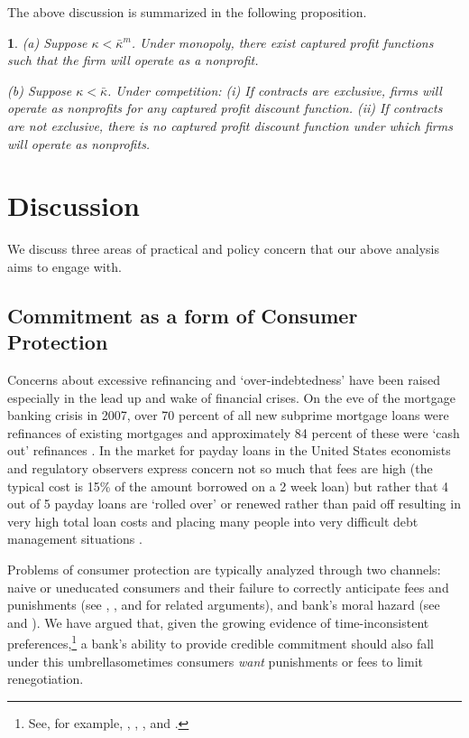 \documentclass[11pt,english]{article}
\theoremstyle{plain}
\newtheorem{prop}{\protect\propositionname}
\theoremstyle{definition}
\providecommand{\propositionname}{Proposition}
\begin{document}
The above discussion is summarized in the following proposition. 
\begin{prop}
(a) Suppose $\kappa<\bar{\kappa}^{m}$. Under monopoly, there exist
captured profit functions such that the firm will operate as a nonprofit.

(b) Suppose $\kappa<\bar{\kappa}$. Under competition: (i) If contracts
are exclusive, firms will operate as nonprofits for any captured profit
discount function. (ii) If contracts are not exclusive, there is no
captured profit discount function under which firms will operate as
nonprofits. 
\end{prop}

\section{Discussion}

We discuss three areas of practical and policy concern that our above
analysis aims to engage with.

\subsection{Commitment as a form of Consumer Protection}

Concerns about excessive refinancing and `over-indebtedness' have
been raised especially in the lead up and wake of financial crises.
On the eve of the mortgage banking crisis in 2007, over 70 percent
of all new subprime mortgage loans were refinances of existing mortgages
and approximately 84 percent of these were `cash out' refinances \citep{demyanyk2011}.
In the market for payday loans in the United States economists and
regulatory observers express concern not so much that fees are high
(the typical cost is 15\% of the amount borrowed on a 2 week loan)
but rather that 4 out of 5 payday loans are `rolled over' or renewed
rather than paid off resulting in very high total loan costs and placing
many people into very difficult debt management situations \citep{deyoung2015}.

Problems of consumer protection are typically analyzed through two
channels: naive or uneducated consumers and their failure to correctly
anticipate fees and punishments (see \citet{gabaix_shrouded_2006},
\citet{armstrong2012}, and \citet{akerlof2015} for related arguments),
and bank's moral hazard (see \citet{dewatripont1999} and \citet{oak2010}).
We have argued that, given the growing evidence of time-inconsistent
preferences,\footnote{See, for example, \citet{laibson2003}, \citet{ashraf_tying_2006},
\citet{gugerty2007}, and \citet{tanaka2010}.} a bank's ability to provide credible commitment should also fall
under this umbrella\textendash sometimes consumers \textit{want} punishments
or fees to limit renegotiation.
\end{document}
